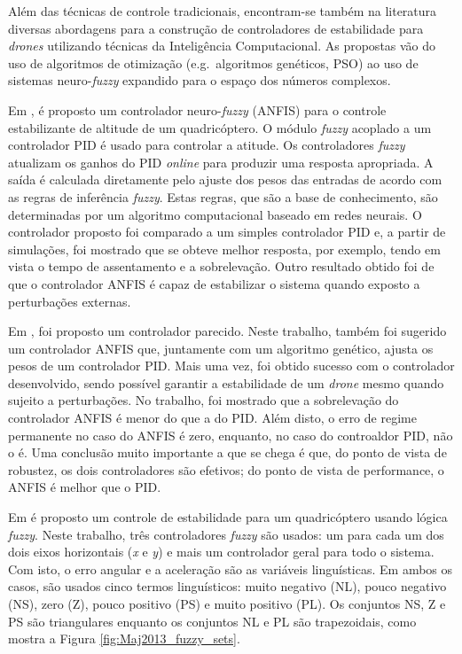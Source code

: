 Além das técnicas de controle tradicionais, encontram-se também na literatura diversas abordagens para a construção de controladores de estabilidade para \textit{drones} utilizando técnicas da Inteligência Computacional. As propostas vão do uso de algoritmos de otimização (e.g.\ algoritmos genéticos, PSO) ao uso de sistemas neuro-\textit{fuzzy} expandido para o espaço dos números complexos.

Em \cite{Rezazadeh2013}, é proposto um controlador neuro-\textit{fuzzy} (ANFIS) para o controle estabilizante de altitude de um quadricóptero. O módulo \textit{fuzzy} acoplado a um controlador PID é usado para controlar a atitude. Os controladores \textit{fuzzy} atualizam os ganhos do PID \textit{online} para produzir uma resposta apropriada. A saída é calculada diretamente pelo ajuste dos pesos das entradas de acordo com as regras de inferência \textit{fuzzy}. Estas regras, que são a base de conhecimento, são determinadas por um algoritmo computacional baseado em redes neurais. O controlador proposto foi comparado a um simples controlador PID e, a partir de simulações, foi mostrado que se obteve melhor resposta, por exemplo, tendo em vista o tempo de assentamento e a sobrelevação. Outro resultado obtido foi de que o controlador ANFIS é capaz de estabilizar o sistema quando exposto a perturbações externas.

Em \cite{Mahfouz2013}, foi proposto um controlador parecido. Neste trabalho, também foi sugerido um controlador ANFIS que, juntamente com um algoritmo genético, ajusta os pesos de um controlador PID. Mais uma vez, foi obtido sucesso com o controlador desenvolvido, sendo possível garantir a estabilidade de um \textit{drone} mesmo quando sujeito a perturbações. No trabalho, foi mostrado que a sobrelevação do controlador ANFIS é menor do que a do PID. Além disto, o erro de regime permanente no caso do ANFIS é zero, enquanto, no caso do controaldor PID, não o é. Uma conclusão muito importante a que se chega é que, do ponto de vista de robustez, os dois controladores são efetivos; do ponto de vista de performance, o ANFIS é melhor que o PID.

Em \cite{Maj2013} é proposto um controle de estabilidade para um quadricóptero usando lógica \textit{fuzzy}. Neste trabalho, três controladores \textit{fuzzy} são usados: um para cada um dos dois eixos horizontais (\textit{x} e \textit{y}) e mais um controlador geral para todo o sistema. Com isto, o erro angular e a aceleração são as variáveis linguísticas. Em ambos os casos, são usados cinco termos linguísticos: muito negativo (NL), pouco negativo (NS), zero (Z), pouco positivo (PS) e muito positivo (PL). Os conjuntos NS, Z e PS são triangulares enquanto os conjuntos NL e PL são trapezoidais, como mostra a Figura \ref{fig:Maj2013_fuzzy_sets}. 


